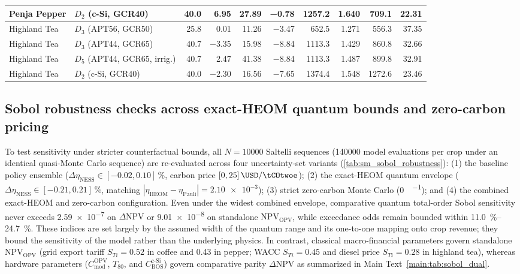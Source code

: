 \documentclass[preprint,12pt,a4paper]{elsarticle}
\begin{document}
\begin{table}[htbp]
{\begin{tabular}{@{}llrrrrrrrr@{}}
 Penja Pepper & $D_2$ (c-Si, GCR40) & \num{40.0} & \num{+6.95} & \num{+27.89} & \num{-0.78} & \num{1257.2} & \num{1.640} & \num{709.1} & \num{22.31} \\
 \midrule
 Highland Tea & $D_3$ (APT56, GCR50) & \num{25.8} & \num{+0.01} & \num{+11.26} & \num{-3.47} & \num{652.5} & \num{1.271} & \num{556.3} & \num{37.35} \\
 Highland Tea & $D_3$ (APT44, GCR65) & \num{40.7} & \num{-3.35} & \num{+15.98} & \num{-8.84} & \num{1113.3} & \num{1.429} & \num{860.8} & \num{32.66} \\
 Highland Tea & $D_5$ (APT44, GCR65, irrig.) & \num{40.7} & \num{+2.47} & \num{+41.38} & \num{-8.84} & \num{1113.3} & \num{1.487} & \num{899.8} & \num{32.91} \\
 Highland Tea & $D_2$ (c-Si, GCR40) & \num{40.0} & \num{-2.30} & \num{+16.56} & \num{-7.65} & \num{1374.4} & \num{1.548} & \num{1272.6} & \num{23.46} \\
 \bottomrule
 \end{tabular}
 }
\end{table}

\subsection{Sobol robustness checks across exact-HEOM quantum bounds and zero-carbon pricing}
\label{sec:sm_sobol_robustness}

To test sensitivity under stricter counterfactual bounds, all $N=\num{10000}$ Saltelli sequences (\num{140000} model evaluations per crop under an identical quasi-Monte Carlo sequence) are re-evaluated across four uncertainty-set variants (\cref{tab:sm_sobol_robustness}): (1) the baseline policy ensemble ($\Delta\eta_{\mathrm{NESS}}\in[\num{-0.02},\num{+0.10}]\,\unit{\percent}$, carbon price $[\num{0},\num{25}]\,\unit{\USD\per\tCOtwoe}$); (2) the exact-HEOM quantum envelope ($\Delta\eta_{\mathrm{NESS}}\in[\num{-0.21},\num{+0.21}]\,\unit{\percent}$, matching $|\eta_{\mathrm{HEOM}}-\eta_{\mathrm{Pauli}}|=\num{2.10e-3}$); (3) strict zero-carbon Monte Carlo (\qty{0}{\USD\per\tCOtwoe}); and (4) the combined exact-HEOM and zero-carbon configuration. Even under the widest combined envelope, comparative quantum total-order Sobol sensitivity never exceeds \num{2.59e-7} on $\Delta\mathrm{NPV}$ or \num{9.01e-8} on standalone $\mathrm{NPV}_{\mathrm{OPV}}$, while exceedance odds remain bounded within \qtyrange{11.0}{24.7}{\percent}. These indices are set largely by the assumed width of the quantum range and its one-to-one mapping onto crop revenue; they bound the sensitivity of the model rather than the underlying physics. In contrast, classical macro-financial parameters govern standalone $\mathrm{NPV}_{\mathrm{OPV}}$ (grid export tariff $S_{Ti}=\num{0.52}$ in coffee and \num{0.43} in pepper; WACC $S_{Ti}=\num{0.45}$ and diesel price $S_{Ti}=\num{0.28}$ in highland tea), whereas hardware parameters ($C_{\mathrm{mod}}^{\mathrm{OPV}}$, $T_{80}$, and $C_{\mathrm{BOS}}^{\mathrm{c\text{-}Si}}$) govern comparative parity $\Delta\mathrm{NPV}$ as summarized in Main Text~\cref{main:tab:sobol_dual}.
\end{document}

